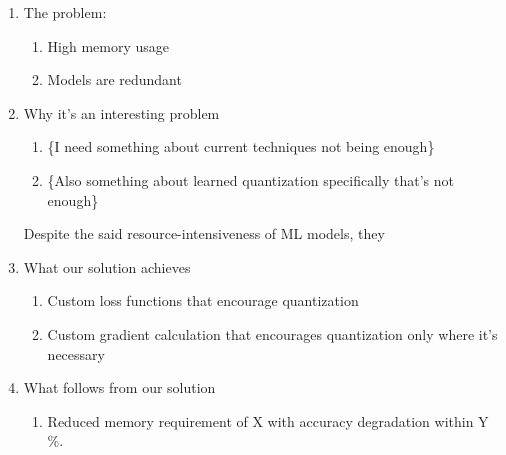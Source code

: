 \begin{enumerate}
    \item The problem:
        \begin{enumerate}
            \item High memory usage
            \item Models are redundant
        \end{enumerate}

    \item Why it's an interesting problem
        \begin{enumerate}
            \item \{I need something about current techniques not being enough\}
            \item \{Also something about learned quantization specifically that's not enough\}
        \end{enumerate}
        Despite the said resource-intensiveness of ML models, they 

    \item What our solution achieves
        \begin{enumerate}
            \item Custom loss functions that encourage quantization
            \item Custom gradient calculation that encourages quantization only where it's necessary 
        \end{enumerate}            
    \item What follows from our solution
        \begin{enumerate}
            \item Reduced memory requirement of X with accuracy degradation within Y \%.
        \end{enumerate}   
\end{enumerate}
